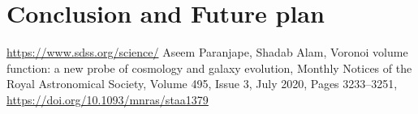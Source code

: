 \documentclass[12pt,twocolumn]{article}
\begin{document}
\section{Conclusion and Future plan}




\begin{thebibliography}{widest entry}
 \url{https://www.sdss.org/science/}
 Aseem Paranjape, Shadab Alam, Voronoi volume function: a new probe of cosmology and galaxy evolution, Monthly Notices of the Royal Astronomical Society, Volume 495, Issue 3, July 2020, Pages 3233–3251, \url{https://doi.org/10.1093/mnras/staa1379}
\end{thebibliography}
\end{document}
